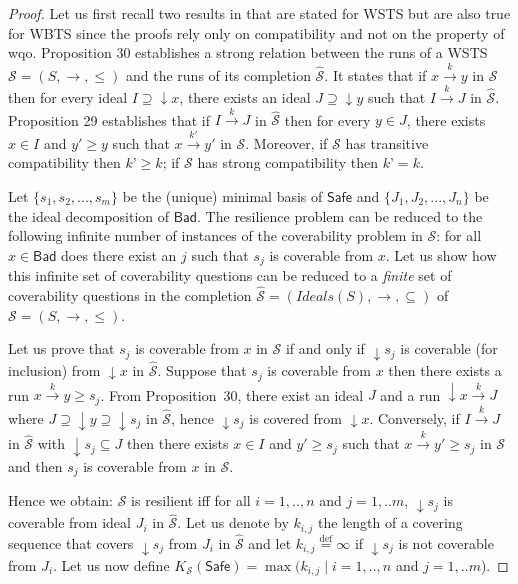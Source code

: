\documentclass[runningheads]{llncs}
\newcommand{\Bad}{\textsf{Bad}}
\newcommand{\Safe}{\textsf{Safe}}
\begin{document}
\begin{proof}
Let us first recall two results in \cite{BFM-ic17} that are stated for WSTS but are also true for WBTS since the proofs rely only on compatibility and not on the property of wqo. Proposition 30 establishes a strong relation between the runs of a WSTS $\mathscr{S}=(S,\rightarrow, \leq)$ and the runs of its completion $\hat{\mathscr{S}}$. It states that if $x \xrightarrow{k} y$ in $\mathscr{S}$ then for every ideal $I \supseteq \mathop{\downarrow} x$, there exists an ideal $J \supseteq \mathop{\downarrow} y$ such that $I \xrightarrow{k} J$ in $\hat{\mathscr{S}}$. Proposition 29 establishes that if $I \xrightarrow{k} J$ in $\hat{\mathscr{S}}$ then for every $y \in J$, there exists $x \in I$ and $y' \geq y$ such that $x \xrightarrow{k'} y'$ in $\mathscr{S}$. Moreover, if $\mathscr{S}$ has transitive compatibility then $k’ \geq k$; if $\mathscr{S}$ has strong compatibility then $k’ = k$.
%

Let  $\{s_1,s_2,...,s_m\}$ be the (unique) minimal basis of $\Safe$ and  $\{J_1, J_2,...,J_n\}$ be the ideal decomposition of $\Bad$.
The resilience problem can be reduced to the following infinite number of instances of the coverability problem in $\mathscr{S}$: for all $x \in \Bad$ does there exist an $j$ such that $s_j$ is coverable from $x$. Let us show how this infinite set of coverability questions can be reduced to a \emph{finite} set of coverability questions in the completion $\hat{\mathscr{S}}=(Ideals(S),\rightarrow, \subseteq)$ of $\mathscr{S}=(S,\rightarrow, \leq)$. 


Let us prove that $s_j$ is coverable from $x$ in $\mathscr{S}$ if and only if $\mathop{\downarrow} s_j$ is coverable (for inclusion) from $\mathop{\downarrow} x$ in $\hat{\mathscr{S}}$.
%
Suppose that $s_j$ is coverable from $x$ then there exists a run $x \xrightarrow{k} y \geq s_j$. From Proposition~30, there exist an ideal $J$ and a run $\mathop{\downarrow} x \xrightarrow{k} J$ where $J \supseteq \mathop{\downarrow} y \supseteq \mathop{\downarrow} s_j$ in $\hat{\mathscr{S}}$, hence $\mathop{\downarrow} s_j$ is covered from $\mathop{\downarrow} x$.
Conversely, if $I \xrightarrow{k} J$ in $\hat{\mathscr{S}}$ with $\mathop{\downarrow} s_j \subseteq J$ then 
there exists $x \in I$ and $y' \geq s_j$ such that $x \xrightarrow{k} y'  \geq s_j$ in $\mathscr{S}$ and then $s_j$ is coverable from $x$ in $\mathscr{S}$.

Hence we obtain: $\mathscr{S}$ is resilient iff for all $i=1,..,n$ and $j= 1,..m$, $\mathop{\downarrow} s_j$ is coverable from ideal $J_i$ in $\hat{\mathscr{S}}$.
%
Let us denote by $k_{i,j}$ the length of a covering sequence that covers $\mathop{\downarrow} s_j$ from $J_i$ in $\hat{\mathscr{S}}$ and let $k_{i,j}\stackrel{\text{def}}{=}\infty$ if $\mathop{\downarrow} s_j$ is not coverable from $J_i$. Let us now define $K_{\mathscr{S}}(\Safe)=\max(k_{i,j} \mid i=1,..,n$ and $j= 1,..m$).
%


\end{proof}
\end{document}
